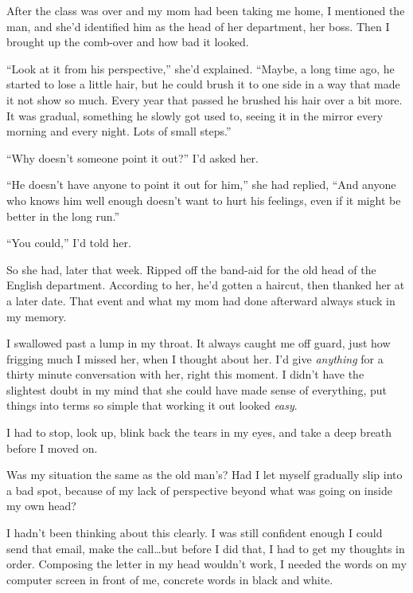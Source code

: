After the class was over and my mom had been taking me home, I mentioned the man, and she'd identified him as the head of her department, her boss.  Then I brought up the comb-over and how bad it looked.



``Look at it from his perspective,'' she'd explained.  ``Maybe, a long time ago, he started to lose a little hair, but he could brush it to one side in a way that made it not show so much.  Every year that passed he brushed his hair over a bit more.  It was gradual, something he slowly got used to, seeing it in the mirror every morning and every night.  Lots of small steps.''



``Why doesn't someone point it out?''  I'd asked her.



``He doesn't have anyone to point it out for him,'' she had replied, ``And anyone who knows him well enough doesn't want to hurt his feelings, even if it might be better in the long run.''



``You could,'' I'd told her.



So she had, later that week.  Ripped off the band-aid for the old head of the English department.  According to her, he'd gotten a haircut, then thanked her at a later date.  That event and what my mom had done afterward always stuck in my memory.



I swallowed past a lump in my throat.  It always caught me off guard, just how frigging much I missed her, when I thought about her.  I'd give \emph{anything} for a thirty minute conversation with her, right this moment.  I didn't have the slightest doubt in my mind that she could have made sense of everything, put things into terms so simple that working it out looked \emph{easy}.



I had to stop, look up, blink back the tears in my eyes, and take a deep breath before I moved on.



Was my situation the same as the old man's?  Had I let myself gradually slip into a bad spot, because of my lack of perspective beyond what was going on inside my own head?



I hadn't been thinking about this clearly.  I was still confident enough I could send that email, make the call\ldots but before I did that, I had to get my thoughts in order.  Composing the letter in my head wouldn't work, I needed the words on my computer screen in front of me, concrete words in black and white.



